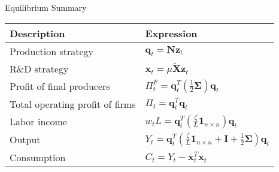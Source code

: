 \documentclass[
  10pt,               %
  aspectratio=169,     %
]{beamer}
\theoremstyle{plain}
\begin{document}
\begin{frame}{Equilibrium Summary}
  \begin{center}
    \renewcommand{\arraystretch}{1.5}
    \begin{tabular}{ll}
      \toprule
      \textbf{Description}            & \textbf{Expression}                                                                                            \\
      \midrule
      Production strategy             & $\bm{q}_{t} = \bm{N}\bm{z}_{t}$                                                                                \\
      R\&D strategy                   & $\bm{x}_{t} = \mu\bm{\tilde{X}}\bm{z}_{t}$                                                                     \\
      Profit of final producers       & $\Pi_{t}^{F} = \bm{q}_{t}^{T}\left(\frac{1}{2}\bm{\Sigma}\right)\bm{q}_{t}$                                    \\
      Total operating profit of firms & $\Pi_{t} = \bm{q}_{t}^{T}\bm{q}_{t}$                                                                           \\
      Labor income                    & $w_{t}L = \bm{q}_{t}^{T}\left(\frac{\zeta}{L}\bm{1}_{n\times n}\right)\bm{q}_{t}$                              \\
      Output                          & $Y_{t} = \bm{q}_{t}^{T}\left(\frac{\zeta}{L}\bm{1}_{n\times n}+\bm{I}+\frac{1}{2}\bm{\Sigma}\right)\bm{q}_{t}$ \\
      Consumption                     & $C_{t} = Y_{t}-\bm{x}_{t}^{T}\bm{x}_{t}$                                                                       \\
      \bottomrule
    \end{tabular}
  \end{center}
  \hyperlink{aggregation}{}
\end{frame}
\end{document}
